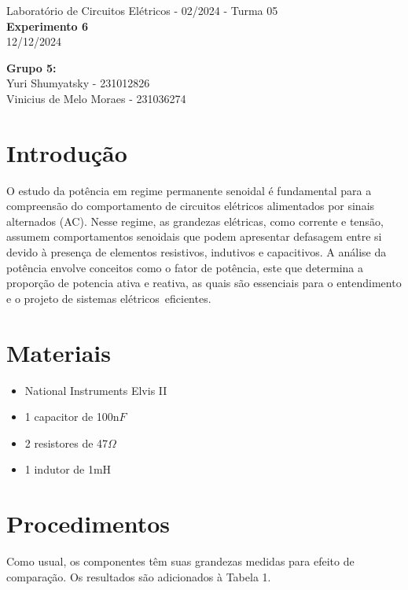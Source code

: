 \documentclass[a4 paper]{article}
\newcommand{\parag}{\hspace{30pt}}
\begin{document}
\justifying
\begin{center}{\large Laboratório de Circuitos Elétricos - 02/2024 - Turma 05}\\
{\large \textbf{Experimento 6}}\\ 
12/12/2024
\end{center}

\vspace{500pt}
 \noindent\textbf{Grupo 5:}\\
 Yuri Shumyatsky - 231012826\\
Vinicius de Melo Moraes - 231036274\\



\vspace{30pt}
\newpage

\section{Introdução}
\parag O estudo da potência em regime permanente senoidal é fundamental para a compreensão do comportamento de circuitos elétricos alimentados por sinais alternados (AC). Nesse regime, as grandezas elétricas, como corrente e tensão, assumem comportamentos senoidais que podem apresentar defasagem entre si devido à presença de elementos resistivos, indutivos e capacitivos. A análise da potência envolve conceitos como o fator de potência, este que determina a proporção de potencia ativa e reativa, as quais são essenciais para o entendimento e o projeto de sistemas elétricos eficientes.



\vspace{5cm}
\section{Materiais}


	\begin{itemize}
	\item National Instruments Elvis II
	\item 1 capacitor de 100n$F$
	\item 2 resistores de 47$\Omega$
	\item 1 indutor de 1mH
	\end{itemize}

\newpage

\section{Procedimentos}
\parag Como usual, os componentes têm suas grandezas medidas para efeito de comparação. Os resultados são adicionados à Tabela 1.
\end{document}
